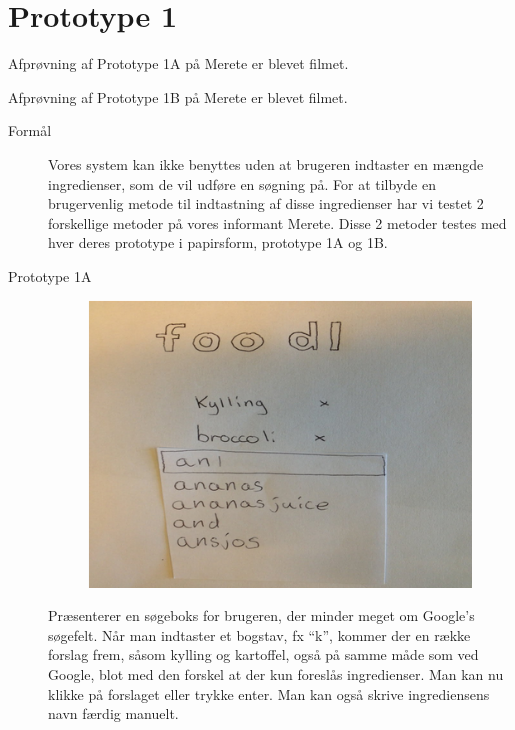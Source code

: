 \section{Prototype 1}
\label{ap:prototype1}

Afprøvning af Prototype 1A på Merete er blevet filmet\cite{prototype1amerete}.

Afprøvning af Prototype 1B på Merete er blevet filmet\cite{prototype1bmerete}.

\begin{description}
\item[Formål] Vores system kan ikke benyttes uden at brugeren indtaster en mængde ingredienser, som de vil udføre en søgning på. For at tilbyde en brugervenlig metode til indtastning af disse ingredienser har vi testet 2 forskellige metoder på vores informant Merete. Disse 2 metoder testes med hver deres prototype i papirsform, prototype 1A og 1B.

\item[Prototype 1A]
\begin{figure}[H]
\centering
\includegraphics[scale=0.7]{billeder/prototyper/prototype1a.png}
\label{fig:prototype1a}
\end{figure}

Præsenterer en søgeboks for brugeren, der minder meget om Google’s søgefelt. Når man indtaster et bogstav, fx “k”, kommer der en række forslag frem, såsom kylling og kartoffel, også på samme måde som ved Google, blot med den forskel at der kun foreslås ingredienser. Man kan nu klikke på forslaget eller trykke enter. Man kan også skrive ingrediensens navn færdig manuelt.


\end{description}
